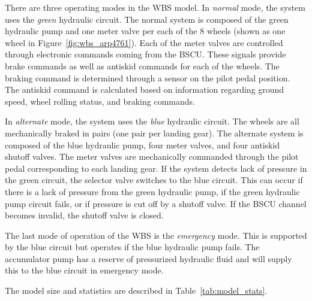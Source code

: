There are three operating modes in the WBS model. In \textit{normal} mode, the system uses the \textit{green} hydraulic circuit. The normal system is composed of the green hydraulic pump and one meter valve per each of the 8 wheels (shown as one wheel in Figure~\ref{fig:wbs_arp4761}). Each of the meter valves are controlled through electronic commands coming from the BSCU. These signals provide brake commands as well as antiskid commands for each of the wheels. The braking command is determined through a sensor on the pilot pedal position. The antiskid command is calculated based on information regarding ground speed, wheel rolling status, and braking commands.

In \textit{alternate} mode, the system uses the \textit{blue} hydraulic circuit.  The wheels are all mechanically braked in pairs (one pair per landing gear). The alternate system is composed of the blue hydraulic pump, four meter valves, and four antiskid shutoff valves. The meter valves are mechanically commanded through the pilot pedal corresponding to each landing gear. If the system detects lack of pressure in the green circuit, the selector valve switches to the blue circuit. This can occur if there is a lack of pressure from the green hydraulic pump, if the green hydraulic pump circuit fails, or if pressure is cut off by a shutoff valve. If the BSCU channel becomes invalid, the shutoff valve is closed.

The last mode of operation of the WBS is the \textit{emergency} mode. This is supported by the blue circuit but operates if the blue hydraulic pump fails. The accumulator pump has a reserve of pressurized hydraulic fluid and will supply this to the blue circuit in emergency mode.

The model size and statistics are described in Table~\ref{tab:model_stats}. 


